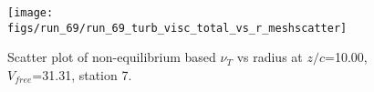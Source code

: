 \begin{figure}[H]
\centering
\texttt{[image: figs/run\_69/run\_69\_turb\_visc\_total\_vs\_r\_meshscatter]}
\caption{Scatter plot of non-equilibrium based $\nu_T$ vs radius at $z/c$=10.00, $V_{free}$=31.31, station 7.}
\label{fig:run_69_turb_visc_total_vs_r_meshscatter}
\end{figure}


